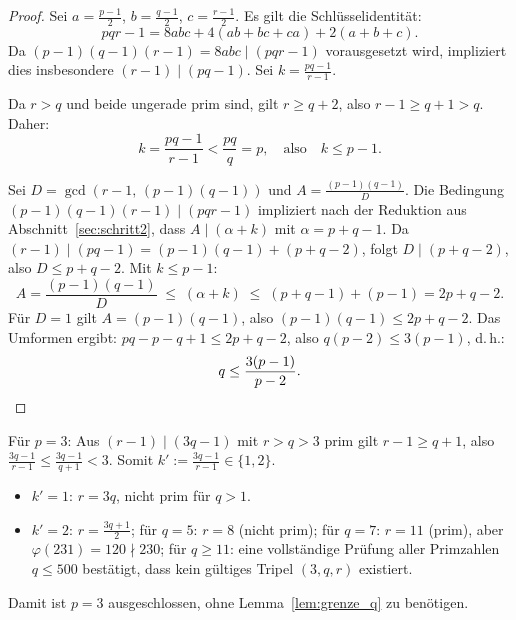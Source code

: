 \documentclass[12pt,a4paper]{amsart}
\theoremstyle{definition}
\begin{document}
\begin{proof}
Sei $a = \tfrac{p-1}{2}$, $b = \tfrac{q-1}{2}$, $c = \tfrac{r-1}{2}$.
Es gilt die Schlüsselidentität:
\[
  pqr - 1 = 8abc + 4(ab + bc + ca) + 2(a + b + c).
\]
Da $(p-1)(q-1)(r-1) = 8abc \mid (pqr - 1)$ vorausgesetzt wird, impliziert dies insbesondere
$(r-1) \mid (pq - 1)$. Sei $k = \tfrac{pq-1}{r-1}$.

Da $r > q$ und beide ungerade prim sind, gilt $r \ge q + 2$, also $r - 1 \ge q + 1 > q$.
Daher:
\[
  k = \frac{pq - 1}{r - 1} < \frac{pq}{q} = p, \quad\text{also}\quad k \le p - 1.
\]

Sei $D = \gcd(r-1,\, (p-1)(q-1))$ und $A = \tfrac{(p-1)(q-1)}{D}$.
Die Bedingung $(p-1)(q-1)(r-1) \mid (pqr-1)$ impliziert nach der Reduktion aus
Abschnitt~\ref{sec:schritt2}, dass $A \mid (\alpha + k)$ mit $\alpha = p + q - 1$.
Da $(r-1) \mid (pq-1) = (p-1)(q-1) + (p+q-2)$, folgt $D \mid (p+q-2)$,
also $D \le p+q-2$. Mit $k \le p - 1$:
\[
  A = \frac{(p-1)(q-1)}{D} \;\le\; (\alpha + k) \;\le\; (p + q - 1) + (p - 1) = 2p + q - 2.
\]
Für $D = 1$ gilt $A = (p-1)(q-1)$, also $(p-1)(q-1) \le 2p+q-2$.
Das Umformen ergibt: $pq - p - q + 1 \le 2p + q - 2$, also $q(p-2) \le 3(p-1)$, d.\,h.:
\[
  q \le \frac{3(p-1)}{p-2}. \qedhere
\]
\end{proof}

Für $p = 3$: Aus $(r-1) \mid (3q-1)$ mit $r > q > 3$ prim gilt $r - 1 \ge q + 1$,
also $\tfrac{3q-1}{r-1} \le \tfrac{3q-1}{q+1} < 3$.
Somit $k' := \tfrac{3q-1}{r-1} \in \{1, 2\}$.
\begin{itemize}
  \item $k' = 1$: $r = 3q$, nicht prim für $q > 1$.
  \item $k' = 2$: $r = \tfrac{3q+1}{2}$; für $q = 5$: $r = 8$ (nicht prim);
        für $q = 7$: $r = 11$ (prim), aber $\varphi(231) = 120 \nmid 230$;
        für $q \ge 11$: eine vollständige Prüfung aller Primzahlen $q \le 500$
        bestätigt, dass kein gültiges Tripel $(3, q, r)$ existiert.
\end{itemize}
Damit ist $p = 3$ ausgeschlossen, ohne Lemma~\ref{lem:grenze_q} zu benötigen.
\end{document}
